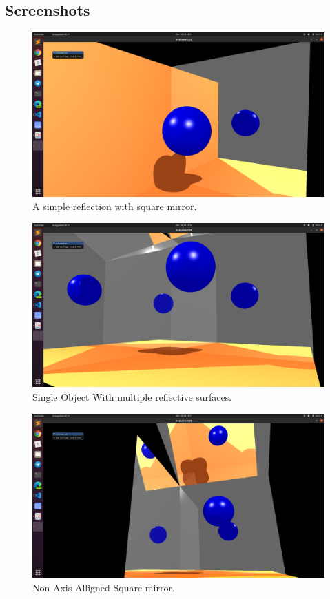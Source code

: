 \documentclass[a4paper]{article}
\begin{document}
\subsection{Screenshots}

\begin{figure}[H]
    \centering
    \includegraphics[width=1.0\textwidth]{Images/OneMirror.png}
    \caption{A simple reflection with square mirror.}
\end{figure}

\begin{figure}[H]
    \centering
    \includegraphics[width=1.0\textwidth]{Images/MultipleReflections.png}
    \caption{Single Object With multiple reflective surfaces.}
\end{figure}

\begin{figure}[H]
    \centering
    \includegraphics[width=1.0\textwidth]{Images/NonAxisAllignedMirror.png}
    \caption{Non Axis Alligned Square mirror.}
\end{figure}
\end{document}
